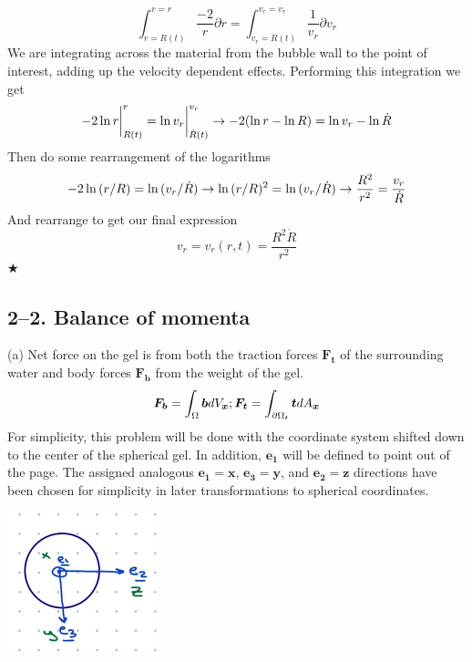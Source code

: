 \documentclass[preprint,12pt,authoryear]{elsarticle}
\begin{document}
\begin{equation}
    \int_{r = R(t)}^{r = r} \frac{-2}{r} \partial r = \int_{v_r = \dot{R}(t)}^{v_r = v_r} \frac{1}{v_r} \partial v_r
\end{equation}
We are integrating across the material from the bubble wall to the point of interest, adding up the velocity dependent effects. Performing this integration we get
\begin{equation}
    -2\ln{r} \biggr\rvert_{R(t)}^{r} = \ln{v_r} \biggr\rvert_{\dot{R}(t)}^{v_r} \space \to \space -2(\ln{r} - \ln{R}) = \ln{v_r} - \ln{\dot{R}}
\end{equation}
Then do some rearrangement of the logarithms
\begin{equation}
    -2\ln{(r/R)} = \ln{(v_r / \dot{R})} \space \to \space \ln{(r/R)^2} = \ln{(v_r / \dot{R})} \space \to \space \frac{R^2}{r^2} = \frac{v_r}{\dot{R}}
\end{equation}
And rearrange to get our final expression
\begin{equation}
    v_r = v_r(r,t) = \frac{R^2 \dot{R}}{r^2}
\end{equation}
\hspace*{\fill} $\bigstar$


\bigskip
\subsection*{2--2. \textbf{Balance of momenta}}

\medskip
(a) Net force on the gel is from both the traction forces $\bm{F_t}$ of the surrounding water and body forces $\bm{F_b}$ from the weight of the gel.
\begin{equation}
    \bm{F_b} = \int_{\Omega}\bm{b} \space dV_{\bm{x}} \space ; \space \bm{F_t} = \int_{\partial \Omega_t}\bm{t} \space dA_{\bm{x}}
\end{equation}
 For simplicity, this problem will be done with the coordinate system shifted down to the center of the spherical gel. In addition, $\bm{e_1}$ will be defined to point out of the page. The assigned analogous $\bm{e_1} = \bm{x}$, $\bm{e_3} = \bm{y}$, and $\bm{e_2} = \bm{z}$ directions have been chosen for simplicity in later transformations to spherical coordinates.

\includegraphics{Dawson-figures/coords-2.2.png}
\end{document}
